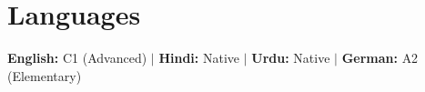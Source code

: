 \section{Languages}
 \begin{itemize}[leftmargin=0.0in, label={}]
    \small{\item{
     \textbf{\normalsize{English:}} \normalsize{C1 (Advanced)} $|$ \textbf{\normalsize{Hindi:}} \normalsize{Native} $|$ \textbf{\normalsize{Urdu:}} \normalsize{Native} $|$ \textbf{\normalsize{German:}} \normalsize{A2 (Elementary)}
    }}
    
 \end{itemize} 